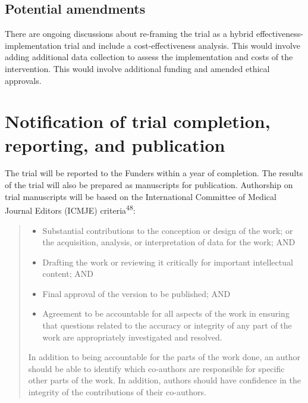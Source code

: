 \documentclass[
]{scrartcl}
\providecommand{\tightlist}{%
  \setlength{\itemsep}{0pt}\setlength{\parskip}{0pt}}\usepackage{longtable,booktabs,array}
\begin{document}
\hypertarget{potential-amendments}{%
\subsection{Potential amendments}\label{potential-amendments}}

There are ongoing discussions about re-framing the trial as a hybrid
effectiveness-implementation trial and include a cost-effectiveness
analysis. This would involve adding additional data collection to assess
the implementation and costs of the intervention. This would involve
additional funding and amended ethical approvals.

\hypertarget{notification-of-trial-completion-reporting-and-publication}{%
\section{Notification of trial completion, reporting, and
publication}\label{notification-of-trial-completion-reporting-and-publication}}

The trial will be reported to the Funders within a year of completion.
The results of the trial will also be prepared as manuscripts for
publication. Authorship on trial manuscripts will be based on the
International Committee of Medical Journal Editors (ICMJE)
criteria\textsuperscript{48}:

\begin{quote}
\begin{itemize}
\tightlist
\item
  Substantial contributions to the conception or design of the work; or
  the acquisition, analysis, or interpretation of data for the work; AND
\item
  Drafting the work or reviewing it critically for important
  intellectual content; AND
\item
  Final approval of the version to be published; AND
\item
  Agreement to be accountable for all aspects of the work in ensuring
  that questions related to the accuracy or integrity of any part of the
  work are appropriately investigated and resolved.
\end{itemize}

In addition to being accountable for the parts of the work done, an
author should be able to identify which co-authors are responsible for
specific other parts of the work. In addition, authors should have
confidence in the integrity of the contributions of their co-authors.
\end{quote}
\end{document}
